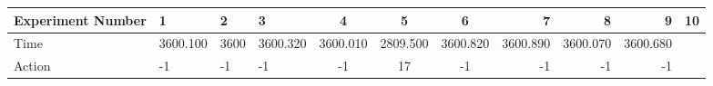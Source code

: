 \documentclass[8pt]{article}
\begin{document}
\begin{landscape}
\begin{tabular}{ | l | l | l | l | c | c | c | r | r | r | r | }
 \hline 
Experiment Number & 1 & 2 & 3 & 4 & 5 & 6 & 7 & 8 & 9 & 10\\ \hline
Time & 3600.100 & 3600 & 3600.320 & 3600.010 & 2809.500 & 3600.820 & 3600.890 & 3600.070 & 3600.680\\ \hline
Action & -1 & -1 & -1 & -1 & 17 & -1 & -1 & -1 & -1\\ \hline\end{tabular}
\end{landscape}
\end{document}
